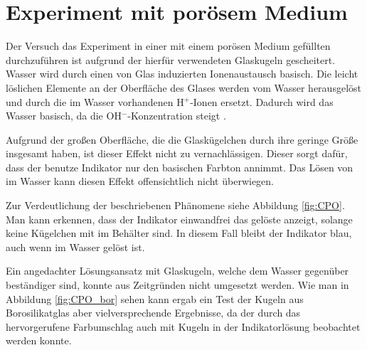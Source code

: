 % 
% 


\newpage

\section{\COTm Experiment mit porösem Medium}
\label{res:cpm}



Der Versuch das \COTm Experiment in einer mit einem porösen Medium gefüllten \HSC durchzuführen ist aufgrund der hierfür verwendeten Glaskugeln gescheitert. Wasser wird durch einen von Glas induzierten Ionenaustausch basisch. Die leicht löslichen Elemente an der Oberfläche des Glases werden vom Wasser herausgelöst und durch die im Wasser vorhandenen H$^+$-Ionen ersetzt. Dadurch wird das Wasser basisch, da die OH$^-$-Konzentration steigt \citep{Vogel}.

Aufgrund der großen Oberfläche, die die Glaskügelchen durch ihre geringe Größe insgesamt haben, ist dieser Effekt nicht zu vernachlässigen. Dieser sorgt dafür, dass der benutze Indikator nur den basischen Farbton annimmt. Das Lösen von \COT im Wasser kann diesen Effekt offensichtlich nicht überwiegen.

Zur Verdeutlichung der beschriebenen Phänomene siehe Abbildung \ref{fig:CPO}. Man kann erkennen, dass der Indikator einwandfrei das gelöste \COT anzeigt, solange keine Kügelchen mit im Behälter sind. In diesem Fall bleibt der Indikator blau, auch wenn \COT im Wasser gelöst ist.

Ein angedachter Lösungsansatz mit Glaskugeln, welche dem Wasser gegenüber beständiger sind, konnte aus Zeitgründen nicht umgesetzt werden. Wie man in Abbildung \ref{fig:CPO_bor} sehen kann ergab ein Test der Kugeln aus Borosilikatglas aber vielversprechende Ergebnisse, da der durch das \COT hervorgerufene Farbumschlag auch mit Kugeln in der Indikatorlösung beobachtet werden konnte.


